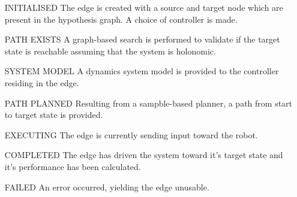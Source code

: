 \begin{enumerate}
    \item[INITIALISED] The edge is created with a source and target node which are present in the hypothesis graph. A choice of controller is made.
    \item[PATH EXISTS] A graph-based search is performed to validate if the target state is reachable assuming that the system is holonomic.
    \item[SYSTEM MODEL] A dynamics system model is provided to the controller residing in the edge.
    \item[PATH PLANNED] Resulting from a sampble-based planner, a path from start to target state is provided. 
    \item[EXECUTING] The edge is currently sending input toward the robot. 
    \item[COMPLETED] The edge has driven the system toward it's target state and it's performance has been calculated.
    \item[FAILED] An error occurred, yielding the edge unusable. 
\end{enumerate}